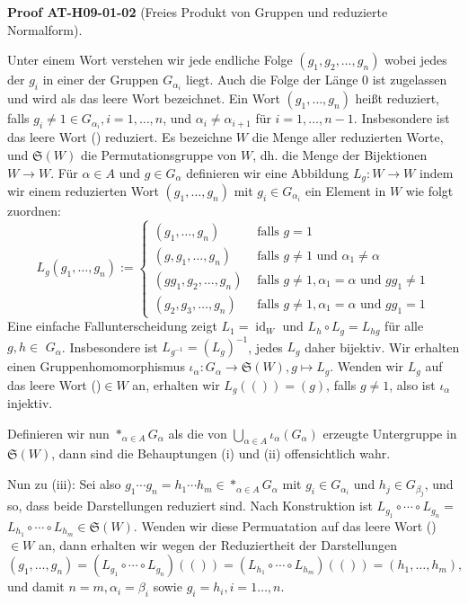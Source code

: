 \documentclass[10pt, letterpaper]{article}
\newcommand{\CustomHeading}[3]{%
  \par\medskip\noindent%
  \textbf{#1 #2} \textnormal{(#3)}.\enskip%
}
\newenvironment{PROOF}[2]{\CustomHeading{Proof}{#1}{#2}}{}
\begin{document}
\begin{PROOF}{AT-H09-01-02}{Freies Produkt von Gruppen und reduzierte Normalform}
Unter einem Wort verstehen wir jede endliche Folge $\left(g_1, g_2, \ldots, g_n\right)$ wobei jedes der $g_i$ in einer der Gruppen $G_{\alpha_i}$ liegt. Auch die Folge der Länge 0 ist zugelassen und wird als das leere Wort bezeichnet. Ein Wort $\left(g_1, \ldots, g_n\right)$ heißt reduziert, falls $g_i \neq 1 \in G_{\alpha_i}, i=1, \ldots, n$, und $\alpha_i \neq \alpha_{i+1}$ für $i=1, \ldots, n-1$. Insbesondere ist das leere Wort () reduziert. Es bezeichne $W$ die Menge aller reduzierten Worte, und $\mathfrak{S}(W)$ die Permutationsgruppe von $W$, dh. die Menge der Bijektionen $W \rightarrow W$. Für $\alpha \in A$ und $g \in G_\alpha$ definieren wir eine Abbildung $L_g: W \rightarrow W$ indem wir einem reduzierten Wort $\left(g_1, \ldots, g_n\right)$ mit $g_i \in G_{\alpha_i}$ ein Element in $W$ wie folgt zuordnen:
$$
L_g\left(g_1, \ldots, g_n\right):= \begin{cases}\left(g_1, \ldots, g_n\right) & \text { falls } g=1 \\ \left(g, g_1, \ldots, g_n\right) & \text { falls } g \neq 1 \text { und } \alpha_1 \neq \alpha \\ \left(g g_1, g_2, \ldots, g_n\right) & \text { falls } g \neq 1, \alpha_1=\alpha \text { und } g g_1 \neq 1 \\ \left(g_2, g_3, \ldots, g_n\right) & \text { falls } g \neq 1, \alpha_1=\alpha \text { und } g g_1=1\end{cases}
$$
Eine einfache Fallunterscheidung zeigt $L_1=\operatorname{id}_W$ und $L_h \circ L_g=L_{h g}$ für alle $g, h \in$ $G_\alpha$. Insbesondere ist $L_{g^{-1}}=\left(L_g\right)^{-1}$, jedes $L_g$ daher bijektiv. Wir erhalten einen Gruppenhomomorphismus $\iota_\alpha: G_\alpha \rightarrow \mathfrak{S}(W), g \mapsto L_g$. Wenden wir $L_g$ auf das leere Wort ()$\in W$ an, erhalten wir $L_g(())=(g)$, falls $g \neq 1$, also ist $\iota_\alpha$ injektiv. 

Definieren wir nun $*_{\alpha \in A} G_\alpha$ als die von $\bigcup_{\alpha \in A} \iota_\alpha\left(G_\alpha\right)$ erzeugte Untergruppe in $\mathfrak{S}(W)$, dann sind die Behauptungen (i) und (ii) offensichtlich wahr. 

Nun zu (iii): Sei also $g_1 \cdots g_n=h_1 \cdots h_m \in *_{\alpha \in A} G_\alpha$ mit $g_i \in G_{\alpha_i}$ und $h_j \in G_{\beta_j}$, und so, dass beide Darstellungen reduziert sind. Nach Konstruktion ist $L_{g_1} \circ \cdots \circ L_{g_n}=$ $L_{h_1} \circ \cdots \circ L_{h_m} \in \mathfrak{S}(W)$. Wenden wir diese Permuatation auf das leere Wort () $\in W$ an, dann erhalten wir wegen der Reduziertheit der Darstellungen
$$
\left(g_1, \ldots, g_n\right)=\left(L_{g_1} \circ \cdots \circ L_{g_n}\right)(())=\left(L_{h_1} \circ \cdots \circ L_{h_m}\right)(())=\left(h_1, \ldots, h_m\right),
$$
und damit $n=m, \alpha_i=\beta_i$ sowie $g_i=h_i, i=1 \ldots, n$. 


\end{PROOF}
\end{document}
